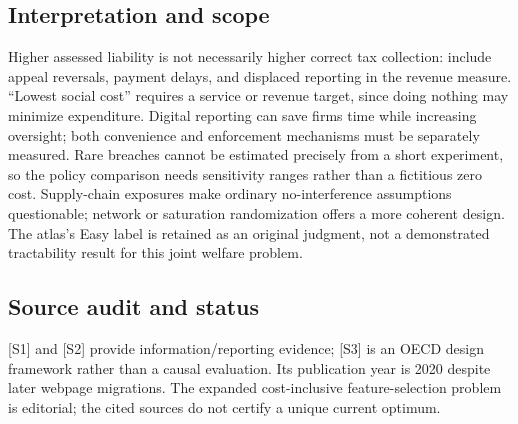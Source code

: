 \documentclass[11pt,a4paper]{article}
\begin{document}
\subsection*{Interpretation and scope}
Higher assessed liability is not necessarily higher correct tax collection: include appeal reversals, payment delays, and displaced reporting in the revenue measure. “Lowest social cost” requires a service or revenue target, since doing nothing may minimize expenditure. Digital reporting can save firms time while increasing oversight; both convenience and enforcement mechanisms must be separately measured. Rare breaches cannot be estimated precisely from a short experiment, so the policy comparison needs sensitivity ranges rather than a fictitious zero cost. Supply-chain exposures make ordinary no-interference assumptions questionable; network or saturation randomization offers a more coherent design. The atlas's Easy label is retained as an original judgment, not a demonstrated tractability result for this joint welfare problem.

\subsection*{Source audit and status}
[S1] and [S2] provide information/reporting evidence; [S3] is an OECD design framework rather than a causal evaluation. Its publication year is 2020 despite later webpage migrations. The expanded cost-inclusive feature-selection problem is editorial; the cited sources do not certify a unique current optimum.
\end{document}
